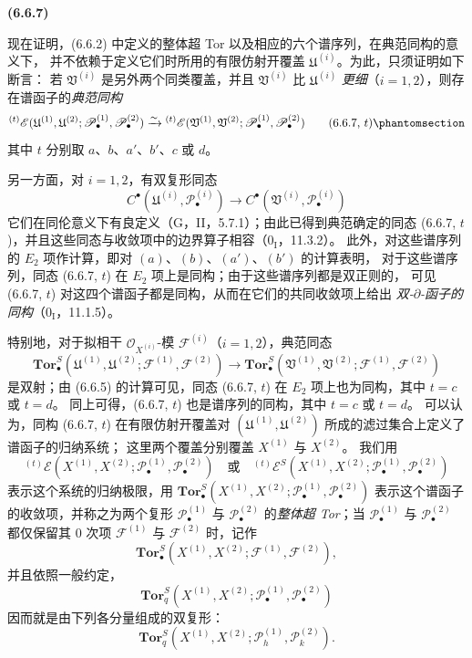 \documentclass[UTF8,fontset=none,11pt,oneside,openany]{ctexbook}
\newenvironment{env}[1][]{%
  \par\medskip\noindent\textbf{(#1)}\ %
}{\par}
\newcommand{\oldpage}[2][]{%
  \hypertarget{ega-source-page-#1-#2}{}%
  \marginnote{\scriptsize\textbf{#1}~|~#2}\ignorespaces}
\let\EGAOriginalLabel\label
\renewcommand{\label}[1]{\phantomsection\EGAOriginalLabel{#1}}
\begin{document}
\begin{env}[6.6.7]
现在证明，(6.6.2) 中定义的整体超 Tor 以及相应的六个谱序列，在典范同构的意义下，
并不依赖于定义它们时所用的有限仿射开覆盖 $\mathfrak U^{(i)}$。为此，只须证明如下断言：
若 $\mathfrak V^{(i)}$ 是另外两个同类覆盖，并且 $\mathfrak V^{(i)}$ 比
$\mathfrak U^{(i)}$ \emph{更细}（$i=1,2$），则存在谱函子的\emph{典范同构}
\[
  {}^{(t)}\mathscr E
  (\mathfrak U^{(1)},\mathfrak U^{(2)};
   \mathscr P_\bullet^{(1)},\mathscr P_\bullet^{(2)})
  \xrightarrow{\sim}
  {}^{(t)}\mathscr E
  (\mathfrak V^{(1)},\mathfrak V^{(2)};
   \mathscr P_\bullet^{(1)},\mathscr P_\bullet^{(2)})
  \tag{6.6.7, $t$}\label{III.6.6.7.t.fr}
\]
其中 $t$ 分别取 $a$、$b$、$a'$、$b'$、$c$ 或 $d$。

另一方面，对 $i=1,2$，有双复形同态
\[
  C^\bullet(\mathfrak U^{(i)},\mathscr P_\bullet^{(i)})
  \longrightarrow
  C^\bullet(\mathfrak V^{(i)},\mathscr P_\bullet^{(i)})
\]
它们在同伦意义下有良定义（G，II，5.7.1）；由此已得到典范确定的同态
(6.6.7, $t$)，并且这些同态与收敛项中的边界算子相容（$0_{\mathrm I}$，11.3.2）。
此外，对这些谱序列的 $E_2$ 项作计算，即对 $(a)$、$(b)$、$(a')$、$(b')$ 的计算表明，
对于这些谱序列，同态 (6.6.7, $t$) 在 $E_2$ 项上是同构；由于这些谱序列都是双正则的，
可见 (6.6.7, $t$) 对这四个谱函子都是同构，从而在它们的共同收敛项上给出
\emph{双-$\partial$-函子的同构}（$0_{\mathrm I}$，11.1.5）。

特别地，对于拟相干 $\mathscr O_{X^{(i)}}$-模 $\mathscr F^{(i)}$（$i=1,2$），典范同态
\[
  \mathbf{Tor}_\bullet^S
  (\mathfrak U^{(1)},\mathfrak U^{(2)};
   \mathscr F^{(1)},\mathscr F^{(2)})
  \longrightarrow
  \mathbf{Tor}_\bullet^S
  (\mathfrak V^{(1)},\mathfrak V^{(2)};
   \mathscr F^{(1)},\mathscr F^{(2)})
\]
是双射；由 (6.6.5) 的计算可见，同态 (6.6.7, $t$) 在 $E_2$ 项上也为同构，其中 $t=c$ 或 $t=d$。
同上可得，(6.6.7, $t$) 也是谱序列的同构，其中 $t=c$ 或 $t=d$。
\oldpage[III]{157}
可以认为，同构 (6.6.7, $t$) 在有限仿射开覆盖对
$(\mathfrak U^{(1)},\mathfrak U^{(2)})$ 所成的滤过集合上定义了谱函子的归纳系统；
这里两个覆盖分别覆盖 $X^{(1)}$ 与 $X^{(2)}$。
我们用
\[
  {}^{(t)}\mathscr E
  (X^{(1)},X^{(2)};
   \mathscr P_\bullet^{(1)},\mathscr P_\bullet^{(2)})
  \quad\text{或}\quad
  {}^{(t)}\mathscr E^S
  (X^{(1)},X^{(2)};
   \mathscr P_\bullet^{(1)},\mathscr P_\bullet^{(2)})
\]
表示这个系统的归纳极限，用
$\mathbf{Tor}_\bullet^S
(X^{(1)},X^{(2)};\mathscr P_\bullet^{(1)},\mathscr P_\bullet^{(2)})$
表示这个谱函子的收敛项，并称之为两个复形 $\mathscr P_\bullet^{(1)}$ 与
$\mathscr P_\bullet^{(2)}$ 的\emph{整体超 Tor}；当 $\mathscr P_\bullet^{(1)}$ 与
$\mathscr P_\bullet^{(2)}$ 都仅保留其 0 次项 $\mathscr F^{(1)}$ 与 $\mathscr F^{(2)}$ 时，记作
\[
  \mathbf{Tor}_\bullet^S
  (X^{(1)},X^{(2)};\mathscr F^{(1)},\mathscr F^{(2)}),
\]
并且依照一般约定，
\[
  \mathbf{Tor}_q^S
  (X^{(1)},X^{(2)};\mathscr P_\bullet^{(1)},\mathscr P_\bullet^{(2)})
\]
因而就是由下列各分量组成的双复形：
\[
  \mathbf{Tor}_q^S
  (X^{(1)},X^{(2)};\mathscr P_h^{(1)},\mathscr P_k^{(2)}).
\]
\end{env}
\end{document}
